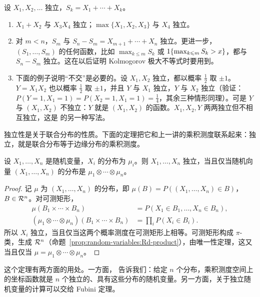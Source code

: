\begin{example}\label{ex:independence:grouping-examples}
设 $X_1,X_2,\dots$ 独立，$S_k=X_1+\cdots+X_k$。
\begin{enumerate}
\item $X_1+X_2$ 与 $X_3X_4$ 独立；$\max\{X_1,X_2,X_3\}$ 与 $X_4$ 独立。
\item 对 $m<n$，$S_m$ 与 $S_n-S_m=X_{m+1}+\cdots+X_n$ 独立。更进一步，$(S_1,\dots,S_m)$ 的任何函数，比如 $\max_{k\leqslant m}S_k$ 或 $1\{\max_{k\leqslant m}S_k>x\}$，都与 $S_n-S_m$ 独立。这在以后证明 Kolmogorov 极大不等式时要用到。
\item 下面的例子说明“不交”是必要的。设 $X_1,X_2$ 独立，都以概率 $\frac12$ 取 $\pm1$。$Y=X_1X_2$ 也以概率 $\frac12$ 取 $\pm1$，并且 $Y$ 与 $X_1$ 独立，$Y$ 与 $X_2$ 独立（验证：$P(Y=1,X_1=1)=P(X_2=1,X_1=1)=\frac14$，其余三种情形同理）。可是 $Y$ 与 $(X_1,X_2)$ 不独立：$Y$ 就是 $(X_1,X_2)$ 的函数。$X_1,X_2,Y$ 两两独立但不相互独立，这是 的另一种写法。
\end{enumerate}
\end{example}


独立性是关于联合分布的性质。下面的定理把它和上一讲的乘积测度联系起来：独立，就是联合分布等于边缘分布的乘积测度。

\begin{theorem}[独立与乘积测度]\label{thm:independence:product-measure}
设 $X_1,\dots,X_n$ 是随机变量，$X_i$ 的分布为 $\mu_i$。则 $X_1,\dots,X_n$ 独立，当且仅当随机向量 $(X_1,\dots,X_n)$ 的分布是 $\mu_1\otimes\cdots\otimes\mu_n$。
\end{theorem}
\begin{proof}
记 $\mu$ 为 $(X_1,\dots,X_n)$ 的分布，即 $\mu(B)=P((X_1,\dots,X_n)\in B)$，$B\in\mathcal{R}^n$。对可测矩形，
\[
\begin{aligned}
\mu(B_1\times\cdots\times B_n)&=P(X_1\in B_1,\dots,X_n\in B_n),\\
(\mu_1\otimes\cdots\otimes\mu_n)(B_1\times\cdots\times B_n)&=\prod_iP(X_i\in B_i).
\end{aligned}
\]
所以 $X_i$ 独立，当且仅当这两个概率测度在可测矩形上相等。可测矩形构成 $\pi$-类，生成 $\mathcal{R}^n$（命题~\ref{prop:random-variables:Rd-product}），由唯一性定理，这又当且仅当 $\mu=\mu_1\otimes\cdots\otimes\mu_n$。
\end{proof}

这个定理有两方面的用处。一方面， 告诉我们：给定 $n$ 个分布，乘积测度空间上的坐标函数就是 $n$ 个独立的、具有这些分布的随机变量。另一方面，关于独立随机变量的计算可以交给 Fubini 定理。

